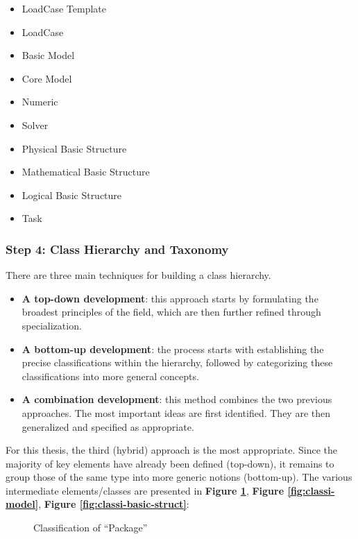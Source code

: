     \begin{itemize}
        \item LoadCase Template
        \item LoadCase
        \item Basic Model
        \item Core Model
        \item Numeric 
        \item Solver
        \item Physical Basic Structure
        \item Mathematical Basic Structure
        \item Logical Basic Structure
        \item Task
    \end{itemize}

    
    \subsubsection{Step 4: Class Hierarchy and Taxonomy}
    There are three main techniques for building a class hierarchy.
    \begin{itemize}
        \item \textbf{A top-down development}: this approach starts by formulating the broadest principles of the field, which are then further refined through specialization.

        \item \textbf{A bottom-up development}: the process starts with establishing the precise classifications within the hierarchy, followed by categorizing these classifications into more general concepts.
        
        \item \textbf{A combination development}: this method combines the two previous approaches. The most important ideas are first identified. They are then generalized and specified as appropriate.
    \end{itemize}
    
    For this thesis, the third (hybrid) approach is the most appropriate. Since the majority of key elements have already been defined (top-down), it remains to group those of the same type into more generic notions (bottom-up). The various intermediate elements/classes are presented in \textbf{Figure \ref{fig:classi-pack}}, \textbf{Figure \ref{fig:classi-model}}, \textbf{Figure \ref{fig:classi-basic-struct}}:
    
    \begin{figure}[h]
        \centering
        \caption{\label{fig:classi-pack} Classification of “Package”}
    \end{figure}
    
